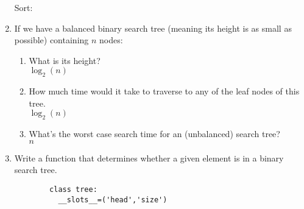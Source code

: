 \documentclass[11pt]{article}
\newenvironment{answer}{\large\lstset{basicstyle=\tiny\ttfamily}\color{white}}{}
\newenvironment{answer}{\large\lstset{basicstyle=\large\ttfamily}\color{red}}{}
\begin{document}
\begin{enumerate}
\begin{answer}
    	Sort:      \newline
    		[\underline{9}, 7, 5, 3, 3, 2, 1] \newline
    		[9, 7, 5, 3, 3, 2, 1] \newline
    \end{answer}

\item If we have a balanced binary search tree (meaning its height is as small as
    possible) containing $n$ nodes:
        \begin{enumerate}
            \item What is its height? \\
                \begin{answer}
                $\log_2(n)$
                \end{answer}
            \item How much time would it take to traverse to any of the leaf
            nodes of this tree. \\
                \begin{answer}
                $\log_2(n)$
                \end{answer}
            \item What's the worst case search time for an (unbalanced) search
            tree? \\
                \begin{answer}
                $n$
                \end{answer}
                \pagebreak
        \end{enumerate}
    \item Write a function that determines whether a given element is in a binary search tree.
        \begin{answer}
        \begin{lstlisting}
        class tree:
          __slots__=('head','size')
  

\end{lstlisting}
\end{answer}
\end{enumerate}
\end{document}
